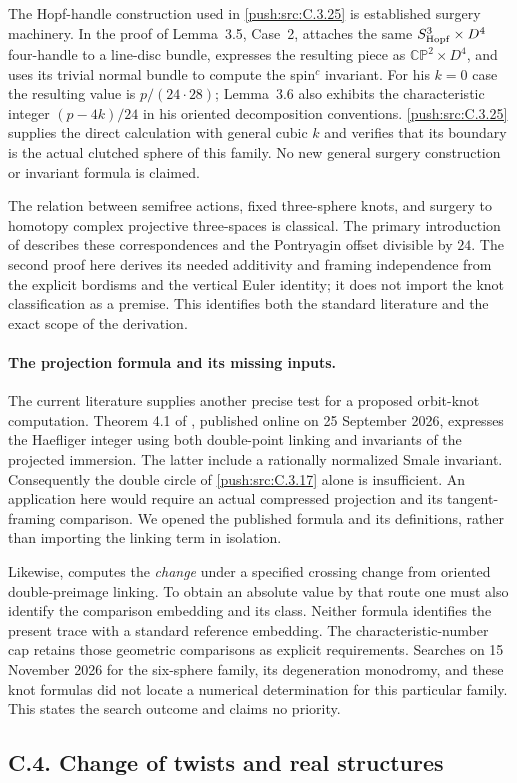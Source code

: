 \begin{remark}
The Hopf-handle construction used in \ref{push:src:C.3.25} is established
surgery machinery. In the proof of Lemma~3.5, Case~2,
\citet{Jiang2014E} attaches the same
$S^3_{\rm Hopf}\times D^4$ four-handle to a line-disc bundle,
expresses the resulting piece as $\mathbb{CP}^2\times D^4$,
and uses its trivial normal bundle to compute the spin$^c$
invariant. For his $k=0$ case the resulting value is
$p/(24\cdot28)$; Lemma~3.6 also exhibits the characteristic
integer $(p-4k)/24$ in his oriented decomposition conventions.
\ref{push:src:C.3.25} supplies the direct calculation with general cubic
$k$ and verifies that its boundary is the actual clutched
sphere of this family. No new general surgery construction
or invariant formula is claimed.

The relation between semifree actions, fixed three-sphere
knots, and surgery to homotopy complex projective three-spaces
is classical. The primary introduction of
\citet[pp.~125--126]{MontgomeryYang1968E} describes these
correspondences and the Pontryagin offset divisible by $24$.
The second proof here derives its needed additivity and
framing independence from the explicit bordisms and the
vertical Euler identity; it does not import the knot
classification as a premise. This identifies both the
standard literature and the exact scope of the derivation.
\end{remark}
\paragraph{The projection formula and its missing inputs.}
The current literature supplies another precise test for a proposed
orbit-knot computation. Theorem 4.1 of
\citet{GauniyalTurchin2026Root}, published online on
25 September 2026, expresses the Haefliger integer using both
double-point linking and invariants of the projected immersion.
The latter include a rationally normalized Smale invariant.
Consequently the double circle of \ref{push:src:C.3.17} alone is insufficient.
An application here would require an actual compressed projection
and its tangent-framing comparison. We opened the published
formula and its definitions, rather than importing the linking
term in isolation.

Likewise, \citet[Theorem 2.5]{Sakai2015Root} computes the
\emph{change} under a specified crossing change from oriented
double-preimage linking. To obtain an absolute value by that
route one must also identify the comparison embedding and its
class. Neither formula identifies the present trace with a
standard reference embedding. The characteristic-number cap
retains those geometric comparisons as explicit requirements.
Searches on 15 November 2026 for the six-sphere family,
its degeneration monodromy, and these knot formulas did not
locate a numerical determination for this particular family.
This states the search outcome and claims no priority.

\subsection{C.4. Change of twists and real structures}

